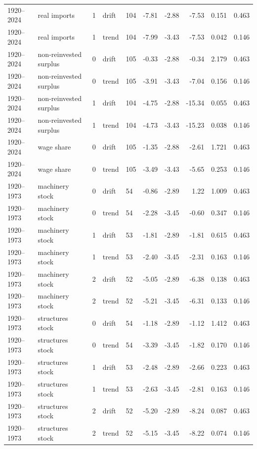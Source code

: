 \documentclass[11pt]{article}
\begin{document}
\begin{longtable}{p{1.6cm}p{3.4cm}p{0.6cm}p{1.1cm}p{0.6cm}rrrrr}
1920--2024 & real imports & 1 & drift & 104 & -7.81 & -2.88 & -7.53 & 0.151 & 0.463 \\
1920--2024 & real imports & 1 & trend & 104 & -7.99 & -3.43 & -7.53 & 0.042 & 0.146 \\
1920--2024 & non-reinvested surplus & 0 & drift & 105 & -0.33 & -2.88 & -0.34 & 2.179 & 0.463 \\
1920--2024 & non-reinvested surplus & 0 & trend & 105 & -3.91 & -3.43 & -7.04 & 0.156 & 0.146 \\
1920--2024 & non-reinvested surplus & 1 & drift & 104 & -4.75 & -2.88 & -15.34 & 0.055 & 0.463 \\
1920--2024 & non-reinvested surplus & 1 & trend & 104 & -4.73 & -3.43 & -15.23 & 0.038 & 0.146 \\
1920--2024 & wage share & 0 & drift & 105 & -1.35 & -2.88 & -2.61 & 1.721 & 0.463 \\
1920--2024 & wage share & 0 & trend & 105 & -3.49 & -3.43 & -5.65 & 0.253 & 0.146 \\
1920--1973 & machinery stock & 0 & drift & 54 & -0.86 & -2.89 & 1.22 & 1.009 & 0.463 \\
1920--1973 & machinery stock & 0 & trend & 54 & -2.28 & -3.45 & -0.60 & 0.347 & 0.146 \\
1920--1973 & machinery stock & 1 & drift & 53 & -1.81 & -2.89 & -1.81 & 0.615 & 0.463 \\
1920--1973 & machinery stock & 1 & trend & 53 & -2.40 & -3.45 & -2.31 & 0.163 & 0.146 \\
1920--1973 & machinery stock & 2 & drift & 52 & -5.05 & -2.89 & -6.38 & 0.138 & 0.463 \\
1920--1973 & machinery stock & 2 & trend & 52 & -5.21 & -3.45 & -6.31 & 0.133 & 0.146 \\
1920--1973 & structures stock & 0 & drift & 54 & -1.18 & -2.89 & -1.12 & 1.412 & 0.463 \\
1920--1973 & structures stock & 0 & trend & 54 & -3.39 & -3.45 & -1.82 & 0.170 & 0.146 \\
1920--1973 & structures stock & 1 & drift & 53 & -2.48 & -2.89 & -2.66 & 0.223 & 0.463 \\
1920--1973 & structures stock & 1 & trend & 53 & -2.63 & -3.45 & -2.81 & 0.163 & 0.146 \\
1920--1973 & structures stock & 2 & drift & 52 & -5.20 & -2.89 & -8.24 & 0.087 & 0.463 \\
1920--1973 & structures stock & 2 & trend & 52 & -5.15 & -3.45 & -8.22 & 0.074 & 0.146 \\

\end{longtable}
\end{document}
